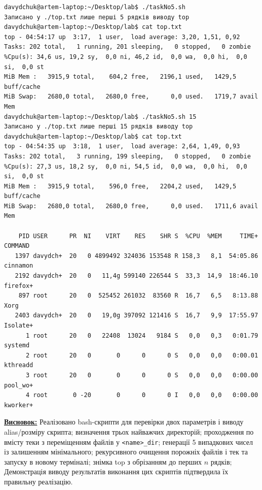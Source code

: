 \documentclass[12pt,a4paper]{article}
\begin{document}
    \begin{verbatim}
davydchuk@artem-laptop:~/Desktop/lab$ ./taskNo5.sh
Записано у ./top.txt лише перші 5 рядків виводу top
davydchuk@artem-laptop:~/Desktop/lab$ cat top.txt
top - 04:54:17 up  3:17,  1 user,  load average: 3,20, 1,51, 0,92
Tasks: 202 total,   1 running, 201 sleeping,   0 stopped,   0 zombie
%Cpu(s): 34,6 us, 19,2 sy,  0,0 ni, 46,2 id,  0,0 wa,  0,0 hi,  0,0 si,  0,0 st 
MiB Mem :   3915,9 total,    604,2 free,   2196,1 used,   1429,5 buff/cache     
MiB Swap:   2680,0 total,   2680,0 free,      0,0 used.   1719,7 avail Mem 
davydchuk@artem-laptop:~/Desktop/lab$ ./taskNo5.sh 15
Записано у ./top.txt лише перші 15 рядків виводу top
davydchuk@artem-laptop:~/Desktop/lab$ cat top.txt
top - 04:54:35 up  3:18,  1 user,  load average: 2,64, 1,49, 0,93
Tasks: 202 total,   3 running, 199 sleeping,   0 stopped,   0 zombie
%Cpu(s): 27,3 us, 18,2 sy,  0,0 ni, 54,5 id,  0,0 wa,  0,0 hi,  0,0 si,  0,0 st 
MiB Mem :   3915,9 total,    596,0 free,   2204,2 used,   1429,5 buff/cache     
MiB Swap:   2680,0 total,   2680,0 free,      0,0 used.   1711,6 avail Mem 

    PID USER      PR  NI    VIRT    RES    SHR S  %CPU  %MEM     TIME+ COMMAND
   1397 davydch+  20   0 4899492 324036 153548 R 158,3   8,1  54:05.86 cinnamon
   2192 davydch+  20   0   11,4g 599140 226544 S  33,3  14,9  18:46.10 firefox+
    897 root      20   0  525452 261032  83560 R  16,7   6,5   8:13.88 Xorg
   2403 davydch+  20   0   19,0g 397092 121416 S  16,7   9,9  17:55.97 Isolate+
      1 root      20   0   22408  13024   9184 S   0,0   0,3   0:01.79 systemd
      2 root      20   0       0      0      0 S   0,0   0,0   0:00.01 kthreadd
      3 root      20   0       0      0      0 S   0,0   0,0   0:00.00 pool_wo+
      4 root       0 -20       0      0      0 I   0,0   0,0   0:00.00 kworker+
    \end{verbatim}

    \textbf{\underline{Висновок:}} Реалізовано bash-скрипти для перевірки двох параметрів і
    виводу alias/розміру скрипта; визначення трьох найважчих директорій; проходження по вмісту теки з переміщенням файлів у
    \texttt{<name>\_dir}; генерації 5 випадкових чисел із залишенням мінімального; рекурсивного очищення порожніх файлів і
    тек та запуску в новому терміналі; знімка top з обрізанням до перших $n$ рядків;
    Демонстрація виводу результатів виконання цих скриптів підтвердила їх правильну реалізацію.
\end{document}
